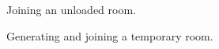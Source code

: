 \begin{figure}
  \centering
  \caption{\label{Figure::unloaded} Joining an unloaded room.}
\end{figure}

\begin{figure}
  \centering
  \caption{\label{Figure::temp} Generating and joining a temporary room.}
\end{figure}

